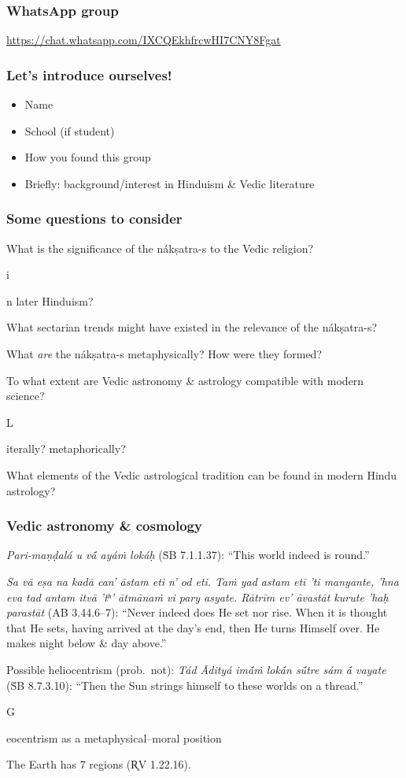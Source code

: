 \documentclass[pdf]{beamer}
\newcommand{\Subitem}[1]{{\setlength\itemindent{12pt} \item[-] #1}}
\begin{document}
\begin{frame} \frametitle{WhatsApp group}
\begin{center}
	\href{https://chat.whatsapp.com/IXCQEkhfrcwHI7CNY8Fgat}{https://chat.whatsapp.com/IXCQEkhfrcwHI7CNY8Fgat}
\end{center}
\end{frame}

\begin{frame} \frametitle{Let's introduce ourselves!}
\begin{itemize}
	\item Name
	\item School (if student)
	\item How you found this group
	\item Briefly: background/interest in Hinduism \& Vedic literature
\end{itemize}
\end{frame}

\begin{frame}[label=questions] \frametitle{Some questions to consider}
\begin{itemize}
	\item What is the significance of the nákṣatra-s to the Vedic religion?
	\Subitem in later Hinduism?
	\item What sectarian trends might have existed in the relevance of the nákṣatra-s?
	\item What \emph{are} the nákṣatra-s metaphysically? How were they formed?
	\item To what extent are Vedic astronomy \& astrology compatible with modern science?
	\Subitem Literally? metaphorically?
	\item What elements of the Vedic astrological tradition can be found in modern Hindu astrology?
\end{itemize}
\end{frame}

\begin{frame} \frametitle{Vedic astronomy \& cosmology}
\begin{itemize}
	\item \textit{Pari-maṇḍalá u vā́ ayáṁ lokáḥ} (ṠB 7.1.1.37): ``This world indeed is round.''
	\item \textit{Sa vā eṣa na kadā can' āstam eti n' od eti.  Taṁ yad astam etī 'ti manyante, 'hna eva tad antam itvā 'tʰ' ātmānaṁ vi pary asyate.  Rātrīm ev' āvastāt kurute 'haḥ parastāt} (AB 3.44.6--7): ``Never indeed does He set nor rise. When it is thought that He sets, having arrived at the day's end, then He turns Himself over.  He makes night below \& day above.''
	\item Possible heliocentrism (prob.~not): \textit{Tád Ādityá imā́ṁ lokā́n sū́tre sám ā́ vayate} (ṠB 8.7.3.10): ``Then the Sun strings himself to these worlds on a thread.''
	\Subitem Geocentrism as a metaphysical--moral position
	\item The Earth has 7 regions (R̥V 1.22.16).
\end{itemize}
\end{frame}
\end{document}
